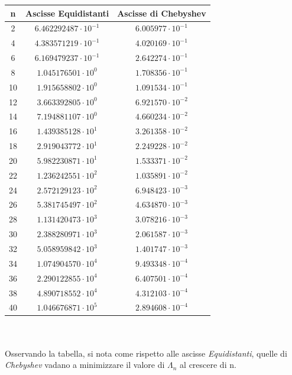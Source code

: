 \begin{tabular}{|c|c|c|}	%
\hline
n&Ascisse Equidistanti&Ascisse di Chebyshev\\\hline
2 &$6.462292487 \cdot 10^{-1}$&$6.005977 \cdot 10^{-1}$\\ \hline
4 &$4.383571219 \cdot 10^{-1}$&$4.020169 \cdot 10^{-1}$\\ \hline
6 &$6.169479237 \cdot 10^{-1}$&$2.642274 \cdot 10^{-1}$\\ \hline
8 &$1.045176501 \cdot 10^{0}$ &$1.708356 \cdot 10^{-1}$\\ \hline
10&$1.915658802 \cdot 10^{0}$ &$1.091534 \cdot 10^{-1}$\\ \hline
12&$3.663392805 \cdot 10^{0}$ &$6.921570 \cdot 10^{-2}$\\ \hline
14&$7.194881107 \cdot 10^{0}$ &$4.660234 \cdot 10^{-2}$\\ \hline
16&$1.439385128 \cdot 10^{1}$ &$3.261358 \cdot 10^{-2}$\\ \hline
18&$2.919043772 \cdot 10^{1}$ &$2.249228 \cdot 10^{-2}$\\ \hline
20&$5.982230871 \cdot 10^{1}$ &$1.533371 \cdot 10^{-2}$\\ \hline
22&$1.236242551 \cdot 10^{2}$ &$1.035891 \cdot 10^{-2}$\\ \hline
24&$2.572129123 \cdot 10^{2}$ &$6.948423 \cdot 10^{-3}$\\ \hline
26&$5.381745497 \cdot 10^{2}$ &$4.634870 \cdot 10^{-3}$\\ \hline
28&$1.131420473 \cdot 10^{3}$ &$3.078216 \cdot 10^{-3}$\\ \hline
30&$2.388280971 \cdot 10^{3}$ &$2.061587 \cdot 10^{-3}$\\ \hline
32&$5.058959842 \cdot 10^{3}$ &$1.401747 \cdot 10^{-3}$\\ \hline
34&$1.074904570 \cdot 10^{4}$ &$9.493348 \cdot 10^{-4}$\\ \hline
36&$2.290122855 \cdot 10^{4}$ &$6.407501 \cdot 10^{-4}$\\ \hline
38&$4.890718552 \cdot 10^{4}$ &$4.312103 \cdot 10^{-4}$\\ \hline
40&$1.046676871 \cdot 10^{5}$ &$2.894608 \cdot 10^{-4}$\\ \hline
\end{tabular}
\\ \\Osservando la tabella, si nota come rispetto alle ascisse \emph{Equidistanti}, quelle di \emph{Chebyshev} vadano a minimizzare il valore di  $\Lambda_n$ al crescere di n.